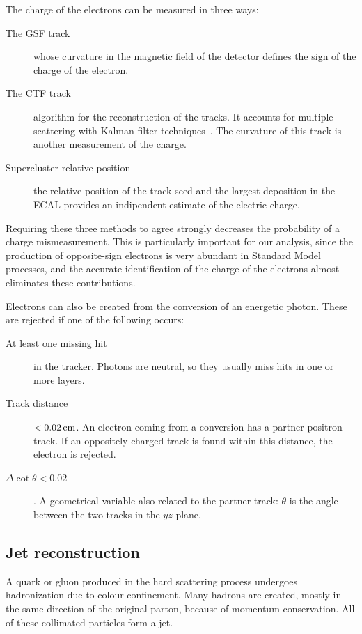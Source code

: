 The charge of the electrons can be measured in three ways:
\begin{description}
    \item[The GSF track] whose curvature in the magnetic field of the
        detector defines the sign of the charge of the electron.
    \item[The CTF track] algorithm for the reconstruction of the
        tracks. It accounts for multiple scattering with Kalman filter
        techniques~\cite{springerlink:10.1140/epjc/s10052-006-0175-5}. The
        curvature of this track is another measurement of the charge.
    \item[Supercluster relative position] the relative position of the track seed
        and the largest deposition in the ECAL provides an indipendent
        estimate of the electric charge.
\end{description}
Requiring these three methods to agree strongly decreases the probability of
a charge mismeasurement. This is particularly important for our analysis,
since the production of opposite-sign electrons is very abundant in Standard
Model processes, and the accurate identification of the charge of the
electrons almost eliminates these contributions.

Electrons can also be created from the conversion of an energetic photon.
These are rejected if one of the following occurs:
\begin{description}
    \item[At least one missing hit] in the tracker. Photons are neutral, so they
        usually miss hits in one or more layers.
    \item[Track distance] $< \unit[0.02]{cm}$. An electron coming from a
        conversion has a partner positron track. If an oppositely charged
        track is found within this distance, the electron is rejected.
    \item[$\Delta \cot \theta < 0.02$]. A geometrical variable also related
        to the partner track: $\theta$ is the angle between the two tracks
        in the $yz$ plane.
\end{description}

\subsection{Jet reconstruction}
A quark or gluon produced in the hard scattering process undergoes
hadronization due to colour confinement. Many hadrons are created, mostly in
the same direction of the original parton, because of momentum conservation.
All of these collimated particles form a jet.


